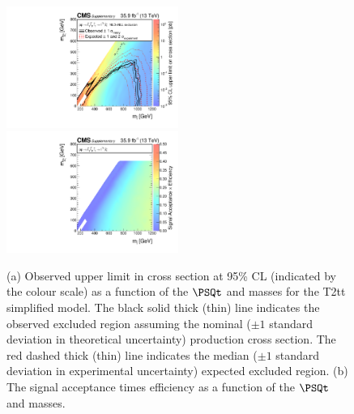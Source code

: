 \begin{figure}
    \begin{center}
            \includegraphics[width=0.50\textwidth]{Supplementary/T2ttXSEC}
            \includegraphics[width=0.50\textwidth]{Supplementary/T2tt_efficiency_aux}
        \caption{ (a) Observed upper limit in cross section at 95\% CL (indicated
        by the colour scale) as a function of 
        the $\PSQt$ and \PSGczDo %
        masses for the 
        T2tt %
        simplified  model.  The  black  solid thick  (thin)  line indicates  the
        observed  excluded  region  assuming   the  nominal  (${\pm}1$  standard
        deviation in theoretical uncertainty)  production cross section. The red
        dashed  thick  (thin)  line  indicates  the  median  (${\pm}1$  standard
        deviation in experimental uncertainty) expected excluded region.
        (b) The signal acceptance times efficiency as a function of 
        the $\PSQt$ and \PSGczDo %
        masses.
        }
        \label{fig:T2tt}
    \end{center}
\end{figure}

